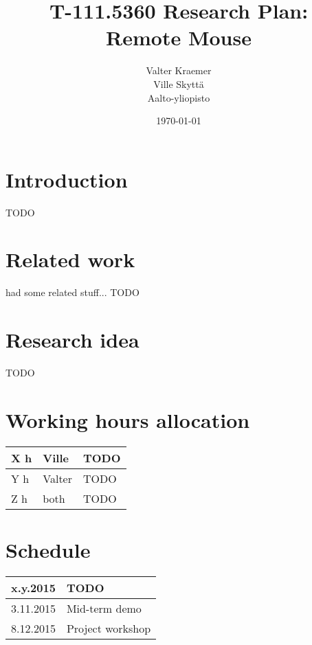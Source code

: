 \documentclass[12pt,a4paper,english,oneside]{article}
\begin{document}
\title{T-111.5360 Research Plan:\\[5mm]
Remote Mouse}

\author{Valter Kraemer\\
  Ville Skyttä\\
Aalto-yliopisto}

\date{\today}

\maketitle


\section{Introduction}

TODO

\section{Related work}

\citet{bassbouss} had some related stuff... TODO

\section{Research idea}

TODO

\section{Working hours allocation}

\begin{tabular}{|p{13mm}|p{13mm}|p{120mm}|}
  \hline
  X h & Ville  & TODO \\ \hline
  Y h & Valter & TODO \\ \hline
  Z h & both   & TODO \\ \hline
\end{tabular}

\section{Schedule}

\begin{tabular}{|p{30mm}|p{120mm}|}
  \hline
  x.y.2015   & TODO \\ \hline
  3.11.2015  & Mid-term demo \\ \hline
  8.12.2015  & Project workshop \\ \hline
\end{tabular}






\end{document}
